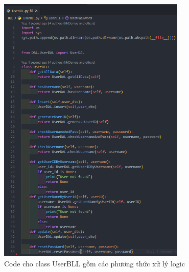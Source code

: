 \documentclass[a4paper]{article}
\begin{document}
\begin{figure}[h]
	\centering
	\includegraphics[width=0.8\textwidth]{images/UserBLL.png}
	\caption{Code cho class UserBLL gồm các phương thức xử lý logic}
\end{figure}
\clearpage
\newpage
\end{document}

